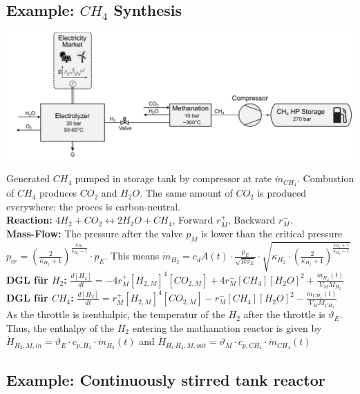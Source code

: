 \documentclass[10pt,a4paper]{scrartcl}
\begin{document}
\begin{multicols*}{3}
\vfill
\null
\columnbreak

\subsection{Example: $CH_4$ Synthesis}
\begin{center}\includegraphics[width=0.65\columnwidth]{synt.png}\end{center}
Generated $CH_4$ pumped in storage tank by compressor at rate $\dot{m}_{CH_4}$. Combustion of $CH_4$ produces $CO_2$ and $H_2O$. The same amount of $CO_2$ is produced everywhere: the proces is carbon-neutral.\\
\textbf{Reaction:} $4H_2+CO_2\leftrightarrow 2H_2O+CH_4$, Forward $r_M^+$, Backward $r_M^-$. \\
\textbf{Mass-Flow:} The pressure after the valve $p_M$ is lower than the critical pressure $p_{cr}=\left( \frac{2}{\kappa_{H_2}+1} \right)^{\frac{\kappa_{H_2}}{\kappa_{H_2}-1}}\cdot p_E$. This means $\dot{m}_{H_2}=c_dA(t)\cdot \frac{p_E}{\sqrt{R\vartheta_E}}\cdot \sqrt{\kappa_{H_2}\cdot \left( \frac{2}{\kappa_{H_2}+1} \right)^{\frac{\kappa_{H_2}+1}{\kappa_{H_2}-1}}}$\\
\textbf{DGL f\"ur $H_2$:} $\frac{d[H_2]}{dt}=-4r_M^+[H_{2,M}]^4[CO_{2,M}]+4r_M^-[CH_4][H_2O]^2+\frac{\dot{m}_{H_2}(t)}{V_MM_{H_2}}$\\
\textbf{DGL f\"ur $CH_4$:} $\frac{d[H_2]}{dt}=r_M^+[H_{2,M}]^4[CO_{2,M}]-r_M^-[CH_4][H_2O]^2-\frac{\dot{m}_{CH_4}(t)}{V_MM_{CH_4}}$\\
As the throttle is isenthalpic, the temperatur of the $H_2$ after the throttle is $\vartheta_E$. Thus, the enthalpy of the $H_2$ entering the mathanation reactor is given by $\dot{H}_{H_2,M,in}=\vartheta_E\cdot c_{p,H_2}\cdot \dot{m}_{H_2}(t)$ and $\dot{H}_{H_CH_4,M,out}=\vartheta_M\cdot c_{p,CH_4}\cdot \dot{m}_{CH_4}(t)$

\vfill
\null
\columnbreak

\subsection{Example: Continuously stirred tank reactor}


\end{multicols*}
\end{document}
